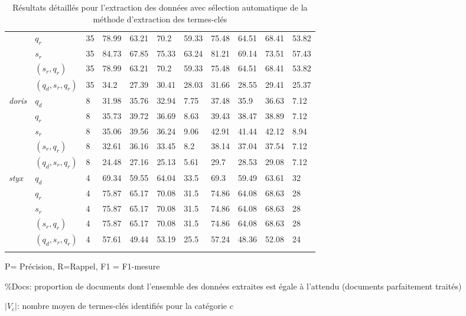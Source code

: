 \begin{table}[!htb]
\begin{tabular}{l|l|l|llll|llll}
		& $q_r$ & 35 & 78.99 & 63.21 & 70.2 & 59.33 & 75.48 & 64.51 & 68.41 & 53.82 \\
		& $s_r$ & 35 & 84.73 & 67.85 & 75.33 & 63.24 & 81.21 & 69.14 & 73.51 & 57.43 \\
		& $(s_r, q_r)$ & 35 & 78.99 & 63.21 & 70.2 & 59.33 & 75.48 & 64.51 & 68.41 & 53.82 \\
		& $(q_d,s_r, q_r)$ & 35 & 34.2 & 27.39 & 30.41 & 28.03 & 31.66 & 28.55 & 29.41 & 25.37 \\ \hline
		\multirow{5}{*}{\textit{doris}}  & $q_d$ & 8 & 31.98 & 35.76 & 32.94 & 7.75 & 37.48 & 35.9 & 36.63 & 7.12 \\
		& $q_r$ & 8 & 35.73 & 39.72 & 36.69 & 8.63 & 39.43 & 38.47 & 38.89 & 7.12 \\
		& $s_r$ & 8 & 35.06 & 39.56 & 36.24 & 9.06 & 42.91 & 41.44 & 42.12 & 8.94 \\
		& $(s_r, q_r)$ & 8 & 32.61 & 36.16 & 33.45 & 8.2 & 38.14 & 37.04 & 37.54 & 7.12 \\
		& $(q_d,s_r, q_r)$ & 8 & 24.48 & 27.16 & 25.13 & 5.61 & 29.7 & 28.53 & 29.08 & 7.12 \\ \hline
		\multirow{5}{*}{\textit{styx}} & $q_d$ & 4 & 69.34 & 59.55 & 64.04 & 33.5 & 69.3 & 59.49 & 63.61 & 32 \\
		& $q_r$ & 4 & 75.87 & 65.17 & 70.08 & 31.5 & 74.86 & 64.08 & 68.63 & 28 \\
		& $s_r$ & 4 & 75.87 & 65.17 & 70.08 & 31.5 & 74.86 & 64.08 & 68.63 & 28 \\
		& $(s_r, q_r)$ & 4 & 75.87 & 65.17 & 70.08 & 31.5 & 74.86 & 64.08 & 68.63 & 28 \\
		& $(q_d,s_r, q_r)$ & 4 & 57.61 & 49.44 & 53.19 & 25.5 & 57.24 & 48.36 & 52.08 & 24  \\
			\hline\noalign{\smallskip}
	\end{tabular}

P= Précision, R=Rappel, F1 = F1-mesure
	
\%Docs: proportion de documents dont l'ensemble des données extraites est égale à l'attendu (documents parfaitement traités)

$\vert V_c \vert$: nombre moyen de termes-clés identifiés pour la catégorie $c$
\caption{Résultats détaillés pour l'extraction des données avec sélection automatique de la méthode d'extraction des termes-clés} \label{tab:quanta:resultDetailExtraction}
\end{table}


